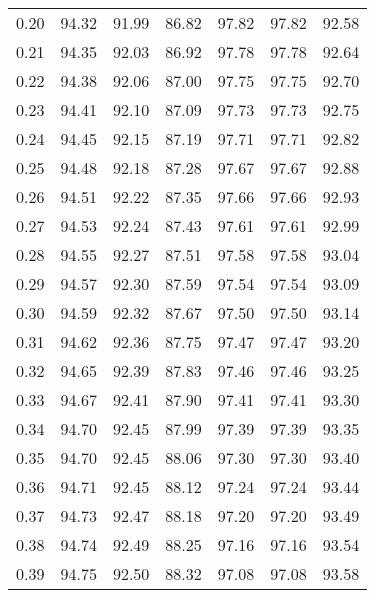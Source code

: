 \begin{tabular}{|c|c|c|c|c|c|c|}
      0.20 &     94.32 &     91.99 &      86.82 &   97.82 &      97.82 &         92.58 \\
      0.21 &     94.35 &     92.03 &      86.92 &   97.78 &      97.78 &         92.64 \\
      0.22 &     94.38 &     92.06 &      87.00 &   97.75 &      97.75 &         92.70 \\
      0.23 &     94.41 &     92.10 &      87.09 &   97.73 &      97.73 &         92.75 \\
      0.24 &     94.45 &     92.15 &      87.19 &   97.71 &      97.71 &         92.82 \\
      0.25 &     94.48 &     92.18 &      87.28 &   97.67 &      97.67 &         92.88 \\
      0.26 &     94.51 &     92.22 &      87.35 &   97.66 &      97.66 &         92.93 \\
      0.27 &     94.53 &     92.24 &      87.43 &   97.61 &      97.61 &         92.99 \\
      0.28 &     94.55 &     92.27 &      87.51 &   97.58 &      97.58 &         93.04 \\
      0.29 &     94.57 &     92.30 &      87.59 &   97.54 &      97.54 &         93.09 \\
      0.30 &     94.59 &     92.32 &      87.67 &   97.50 &      97.50 &         93.14 \\
      0.31 &     94.62 &     92.36 &      87.75 &   97.47 &      97.47 &         93.20 \\
      0.32 &     94.65 &     92.39 &      87.83 &   97.46 &      97.46 &         93.25 \\
      0.33 &     94.67 &     92.41 &      87.90 &   97.41 &      97.41 &         93.30 \\
      0.34 &     94.70 &     92.45 &      87.99 &   97.39 &      97.39 &         93.35 \\
      0.35 &     94.70 &     92.45 &      88.06 &   97.30 &      97.30 &         93.40 \\
      0.36 &     94.71 &     92.45 &      88.12 &   97.24 &      97.24 &         93.44 \\
      0.37 &     94.73 &     92.47 &      88.18 &   97.20 &      97.20 &         93.49 \\
      0.38 &     94.74 &     92.49 &      88.25 &   97.16 &      97.16 &         93.54 \\
      0.39 &     94.75 &     92.50 &      88.32 &   97.08 &      97.08 &         93.58 \\

\end{tabular}
